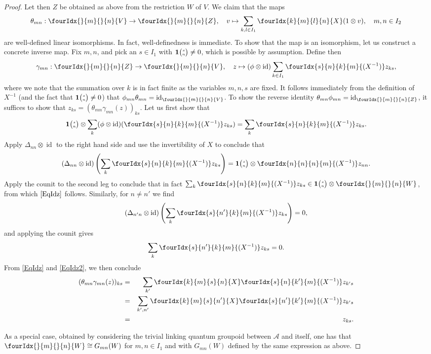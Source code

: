 \documentclass[10pt]{article}
\DeclareMathOperator{\id}{id}
\newcommand{\Grt}[3]{#1{\tiny {\begin{pmatrix} #2\\#3\end{pmatrix}}}}
\newcommand{\UnitC}[2]{\Grt{\mathbf{1}}{#1}{#2}}
\newcommand{\Gr}[5]{\fourIdx{#2}{#4}{#3}{#5}{#1}}%
\newcommand{\Gru}[3]{\Gr{#1}{}{}{#2}{#3}}
\theoremstyle{definition}
\numberwithin{equation}{section}
\begin{document}
\begin{proof}
Let then $Z$ be obtained as above from the restriction $W$ of $V$. We claim that the maps \[\theta_{mn}:\Gru{V}{m}{n}\rightarrow \Gru{Z}{m}{n},\quad v \mapsto \sum_{k,l\in I_1} \Gr{X}{k}{l}{m}{n}(1\otimes v),\quad m,n\in I_2\]  are well-defined linear isomorphisms. In fact, well-definedness is immediate. To show that the map is an isomorphism, let us construct a concrete inverse map. Fix $m,n$, and pick an $s\in I_1$ with $\UnitC{s}{n}\neq 0$, which is possible by assumption. Define then \[\gamma_{mn}:\Gru{Z}{m}{n} \rightarrow \Gru{V}{m}{n},\quad z \mapsto (\phi\otimes \id)\sum_{k\in I_1} \Gr{(X^{-1})}{s}{k}{n}{m}z_{ks},\] where we note that the summation over $k$ is in fact finite as the variables $m,n,s$ are fixed. It follows immediately from the definition of $X^{-1}$ (and the fact that $\UnitC{s}{n}\neq 0$) that $\phi_{mn}\theta_{mn} = \id_{\Gru{V}{m}{n}}$. To show the reverse identity $\theta_{mn}\phi_{mn} = \id_{\Gru{Z}{m}{n}}$, it suffices to show that $z_{ks} = (\theta_{mn}\gamma_{mn}(z))_{ks}$. Let us first show that \begin{equation}\label{EqIdz} \UnitC{s}{n}\otimes \sum_k (\phi\otimes \id)(\Gr{(X^{-1})}{s}{k}{n}{m}z_{ks}) = \sum_k \Gr{(X^{-1})}{s}{k}{n}{m}z_{ks}.\end{equation} Apply $\Delta_{nn}\otimes \id$ to the right hand side and use the invertibility of $X$ to conclude that  \[(\Delta_{nn}\otimes \id)\left(\sum_k \Gr{(X^{-1})}{s}{k}{n}{m}z_{ks}\right) = \UnitC{s}{n}\otimes \Gr{(X^{-1})}{n}{n}{n}{m}z_{nn}.\] Apply the counit to the second leg to conclude that in fact $\sum_k \Gr{(X^{-1})}{s}{k}{n}{m}z_{ks} \in \UnitC{s}{n} \otimes \Gru{W}{m}{n}$, from which $\eqref{EqIdz}$ follows. Similarly, for $n\neq n'$ we find  \[(\Delta_{n'n}\otimes \id)\left(\sum_k \Gr{(X^{-1})}{s}{k}{n'}{m}z_{ks}\right) =0,\] and applying the counit gives \begin{equation}\label{EqIdz2} \sum_k \Gr{(X^{-1})}{s}{k}{n'}{m}z_{ks} =0.\end{equation} From \eqref{EqIdz} and \eqref{EqIdz2}, we then conclude 
\begin{eqnarray*} (\theta_{mn}\gamma_{mn}(z))_{ks} &=& \sum_{k'} \Gr{X}{k}{s}{m}{n}\Gr{(X^{-1})}{s}{k'}{n}{m}z_{k's} \\ &=& \sum_{k',n'} \Gr{X}{k}{s}{m}{n'}\Gr{(X^{-1})}{s}{k'}{n'}{m}z_{k's} \\ &=& z_{ks}.\end{eqnarray*} 

As a special case, obtained by considering the trivial linking quantum groupoid between $\mathscr{A}$ and itself, one has that $\Gru{W}{m}{n}\cong G_{mn}(W)$ for $m,n\in I_1$ and with $G_{mn}(W)$ defined by the same expression as above.


\end{proof}
\end{document}
